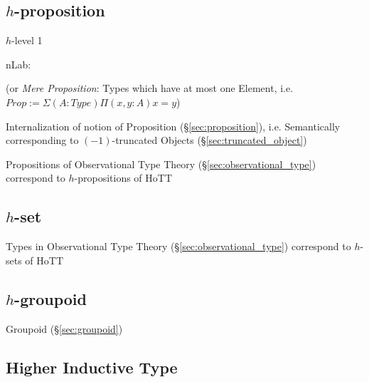 \subsection{$h$-proposition}\label{sec:h_proposition}

$h$-level 1

nLab:

(or \emph{Mere Proposition}: Types which have at most one Element,
i.e. $Prop := \Sigma(A : Type) \Pi(x, y : A) x = y$)

Internalization of notion of Proposition (\S\ref{sec:proposition}),
i.e. Semantically corresponding to $(-1)$-truncated Objects
(\S\ref{sec:truncated_object})

Propositions of Observational Type Theory
(\S\ref{sec:observational_type}) correspond to $h$-propositions of HoTT



\subsection{$h$-set}\label{sec:h_set}

Types in Observational Type Theory (\S\ref{sec:observational_type})
correspond to $h$-sets of HoTT



\subsection{$h$-groupoid}\label{sec:h_groupoid}

Groupoid (\S\ref{sec:groupoid})



\subsection{Higher Inductive Type}\label{sec:higher_inductive_type}

